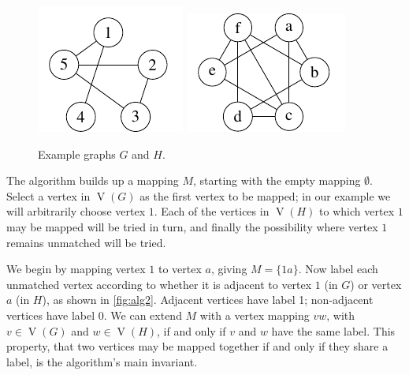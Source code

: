 \documentclass[letterpaper]{article}
\DeclareMathOperator{\V}{V}
\begin{document}
\begin{figure}[t]
\centering
    \includegraphics{graph_G}
    \includegraphics{graph_H}
\caption{Example graphs $G$ and $H$.}
\label{fig:alg1}
\end{figure}

The algorithm builds up a mapping $M$, starting with the empty mapping
$\emptyset$. Select a vertex in $\V(G)$ as the first vertex to be mapped; in
our example we will arbitrarily choose vertex $1$. Each of the vertices in
$\V(H)$ to which vertex $1$ may be mapped will be tried in turn, and finally the
possibility where vertex $1$ remains unmatched will be tried.

We begin by mapping vertex $1$ to vertex $a$, giving $M=\{1a\}$.  Now label
each unmatched vertex according to whether it is adjacent to vertex $1$ (in
$G$) or vertex $a$ (in $H$), as shown in \cref{fig:alg2}.  Adjacent
vertices have label 1; non-adjacent vertices have label 0.  We can extend $M$
with a vertex mapping $vw$, with $v \in \V(G)$ and $w \in \V(H)$, if and only
if $v$ and $w$ have the same label.  This property, that two vertices may be
mapped together if and only if they share a label, is the algorithm's main
invariant.
\end{document}

